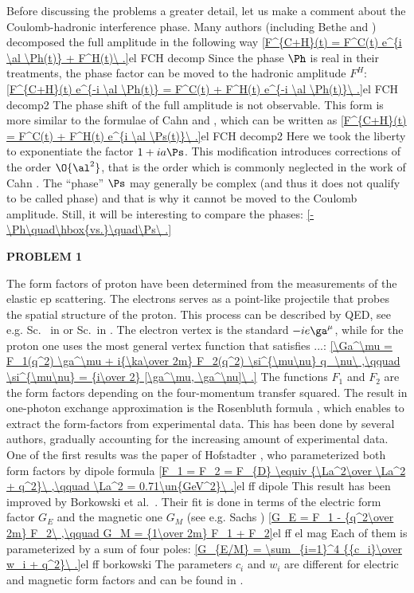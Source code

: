 Before discussing the problems a greater detail, let us make a comment about the Coulomb-hadronic interference phase. Many authors (including Bethe  and \WY{} ) decomposed the full amplitude in the following way
\eqref{F^{C+H}(t) = F^C(t) e^{i \al \Ph(t)} + F^H(t)\ .}{el FCH decomp}
Since the phase $\Ph$ is real in their treatments, the phase factor can be moved to the hadronic amplitude $F^H$:
\eqref{F^{C+H}(t) e^{-i \al \Ph(t)} = F^C(t) + F^H(t) e^{-i \al \Ph(t)}\ .}{el FCH decomp2}
The phase shift of the full amplitude is not observable. This form is more similar to the formulae of Cahn  and \KL{} , which can be written as
\eqref{F^{C+H}(t) = F^C(t) + F^H(t) e^{i \al \Ps(t)}\ .}{el FCH decomp2}
Here we took the liberty to exponentiate the factor $1+ia\Ps$. This modification introduces corrections of the order $\O{\al^2}$, that is the order which is commonly neglected in the work of Cahn . The ``phase'' $\Ps$ may generally be complex (and thus it does not qualify to be called phase) and that is why it cannot be moved to the Coulomb amplitude. Still, it will be interesting to compare the phases:
\eqref{-\Ph\quad\hbox{vs.}\quad\Ps\ .}{}

{\bf PROBLEM 1}

The form factors of proton have been determined from the measurements of the elastic ep scattering. The electrons serves as a point-like projectile that probes the spatial structure of the proton. This process can be described by QED, see e.g. Sc. ~in  or Sc.~in . The electron vertex is the standard $-ie\ga^\mu$, while for the proton one uses the most general vertex function that satisfies ...:
\eqref{\Ga^\mu = F_1(q^2) \ga^\mu + i{\ka\over 2m} F_2(q^2) \si^{\mu\nu} q_\nu\ ,\qquad \si^{\mu\nu} = {i\over 2} [\ga^\mu, \ga^\nu]\ .}{}
The functions $F_1$ and $F_2$ are the form factors depending on the four-momentum transfer squared. The result in one-photon exchange approximation is the Rosenbluth formula , which enables to extract the form-factors from experimental data. This has been done by several authors, gradually accounting for the increasing amount of experimental data. One of the first results was the paper of Hofstadter , who parameterized both form factors by dipole formula
\eqref{F_1 = F_2 = F_{D} \equiv {\La^2\over \La^2 + q^2}\ ,\qquad \La^2 = 0.71\un{GeV^2}\ .}{el ff dipole}
This result has been improved by Borkowski et al.~. Their fit is done in terms of the electric form factor $G_E$ and the magnetic one $G_M$ (see e.g. Sachs )
\eqref{G_E = F_1 - {q^2\over 2m} F_2\ ,\qquad G_M = {1\over 2m} F_1 + F_2}{el ff el mag}
Each of them is parameterized by a sum of four poles:
\eqref{G_{E/M} = \sum_{i=1}^4 {{c_i}\over w_i + q^2}\ .}{el ff borkowski}
The parameters $c_i$ and $w_i$ are different for electric and magnetic form factors and can be found in .

